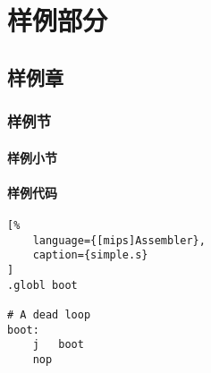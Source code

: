 \part{样例部分}

\chapter{样例章}
\zhlipsum[1][name=zhufu]

\section{样例节}
\zhlipsum[2-3][name=zhufu]

\subsection{样例小节}
\zhlipsum[4-5][name=zhufu]

\subsection{样例代码}

\begin{lstlisting}[%
    language={[mips]Assembler},
    caption={simple.s}
]
.globl boot

# A dead loop
boot:
    j   boot
    nop
\end{lstlisting}
